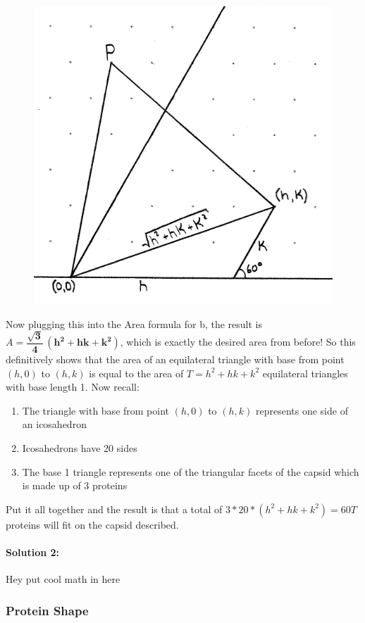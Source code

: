 \documentclass[12pt,letter]{article}
\begin{document}
\begin{figure}[h]
	\centering
	\caption{}
	\includegraphics[width=.45\textwidth]{ddagger3.pdf}
	\label{fig:equil_baselength}
\end{figure}

Now plugging this into the Area formula for b, the result is $A = \mathbf{ \dfrac{\sqrt{3}} {4} \, (h^2 + hk + k^2) }$, which is exactly the desired area from before! So this definitively shows that the area of an equilateral triangle with base from point $(h,0)$ to $(h,k)$ is equal to the area of $T = h^2 + hk + k^2$ equilateral triangles with base length 1. Now recall:

\begin{enumerate}
	\item The triangle with base from point $(h,0)$ to $(h,k)$ represents one side of an icosahedron
	\item Icosahedrons have 20 sides
	\item The base 1 triangle represents one of the triangular facets of the capsid which is made up of 3 proteins
\end{enumerate}

Put it all together and the result is that a total of $3*20*(h^2 + hk + k^2) = 60 T$ proteins will fit on the capsid described.

\paragraph{Solution 2:}

Hey put cool math in here


\subsubsection{Protein Shape}
\end{document}
